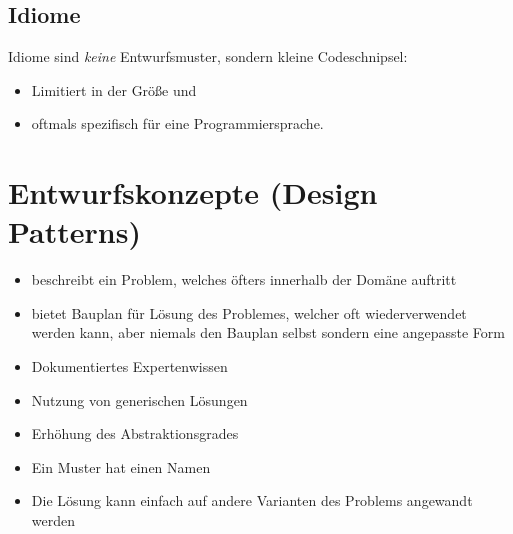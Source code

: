 \documentclass[
    ngerman,
    color=3b,
    summary,
    boxarc,
    main,
]{rubos-tuda-template}
\begin{document}
\subsection{Idiome}
Idiome sind \textit{keine} Entwurfsmuster, sondern kleine Codeschnipsel:
\begin{itemize}
    \item Limitiert in der Größe und
    \item oftmals spezifisch für eine Programmiersprache.
\end{itemize}


\clearpage
\section{Entwurfskonzepte (Design Patterns)}
\begin{definition}\mbox{}
    \begin{itemize}
        \item beschreibt ein Problem, welches öfters innerhalb der Domäne auftritt
        \item bietet Bauplan für Lösung des Problemes, welcher oft wiederverwendet werden kann, aber niemals den Bauplan selbst sondern eine angepasste Form
    \end{itemize}
\end{definition}
\begin{itemize}
    \item Dokumentiertes Expertenwissen
    \item Nutzung von generischen Lösungen
    \item Erhöhung des Abstraktionsgrades
    \item Ein Muster hat einen Namen
    \item Die Lösung kann einfach auf andere Varianten des Problems angewandt werden
\end{itemize}
\end{document}
